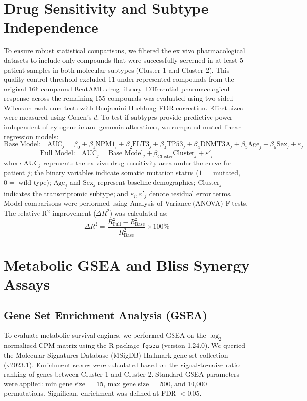\documentclass[11pt,a4paper]{article}
\begin{document}
\section{Drug Sensitivity and Subtype Independence}
To ensure robust statistical comparisons, we filtered the ex vivo pharmacological datasets to include only compounds that were successfully screened in at least 5 patient samples in both molecular subtypes (Cluster 1 and Cluster 2). This quality control threshold excluded 11 under-represented compounds from the original 166-compound BeatAML drug library. Differential pharmacological response across the remaining 155 compounds was evaluated using two-sided Wilcoxon rank-sum tests with Benjamini-Hochberg FDR correction. Effect sizes were measured using Cohen's $d$.
To test if subtypes provide predictive power independent of cytogenetic and genomic alterations, we compared nested linear regression models:
\begin{equation}
\text{Base Model:} \quad \text{AUC}_j = \beta_0 + \beta_1 \text{NPM1}_j + \beta_2 \text{FLT3}_j + \beta_3 \text{TP53}_j + \beta_4 \text{DNMT3A}_j + \beta_5 \text{Age}_j + \beta_6 \text{Sex}_j + \varepsilon_j
\end{equation}
\begin{equation}
\text{Full Model:} \quad \text{AUC}_j = \text{Base Model}_j + \beta_{\text{Cluster}} \text{Cluster}_j + \varepsilon'_j
\end{equation}
where $\text{AUC}_j$ represents the ex vivo drug sensitivity area under the curve for patient $j$; the binary variables indicate somatic mutation status ($1 =$ mutated, $0 =$ wild-type); $\text{Age}_j$ and $\text{Sex}_j$ represent baseline demographics; $\text{Cluster}_j$ indicates the transcriptomic subtype; and $\varepsilon_j, \varepsilon'_j$ denote residual error terms. Model comparisons were performed using Analysis of Variance (ANOVA) F-tests. The relative R$^2$ improvement ($\Delta R^2$) was calculated as:
\begin{equation}
\Delta R^2 = \frac{R^2_{\text{Full}} - R^2_{\text{Base}}}{R^2_{\text{Base}}} \times 100\%
\end{equation}

\section{Metabolic GSEA and Bliss Synergy Assays}

\subsection{Gene Set Enrichment Analysis (GSEA)}
To evaluate metabolic survival engines, we performed GSEA on the $\log_2$-normalized CPM matrix using the R package \texttt{fgsea} (version 1.24.0). We queried the Molecular Signatures Database (MSigDB) Hallmark gene set collection (v2023.1). Enrichment scores were calculated based on the signal-to-noise ratio ranking of genes between Cluster 1 and Cluster 2. Standard GSEA parameters were applied: min gene size $= 15$, max gene size $= 500$, and 10,000 permutations. Significant enrichment was defined at FDR $< 0.05$.
\end{document}
